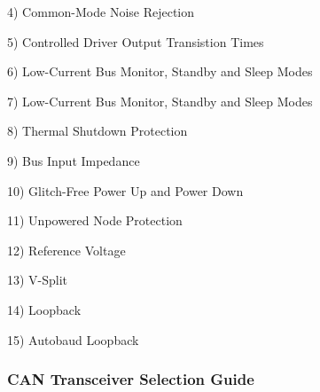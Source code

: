 4) Common-Mode Noise Rejection

5) Controlled Driver Output Transistion Times

6) Low-Current Bus Monitor, Standby and Sleep Modes

7) Low-Current Bus Monitor, Standby and Sleep Modes

8) Thermal Shutdown Protection

9)  Bus Input Impedance

10)  Glitch-Free Power Up and Power Down

11)  Unpowered Node Protection

12) Reference Voltage

13) V-Split

14) Loopback

15) Autobaud Loopback


\subsubsection{CAN Transceiver Selection Guide }



 